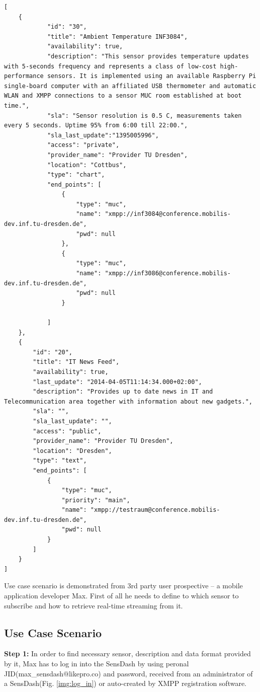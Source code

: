 	\begin{lstlisting}[label=sensor_registry,caption=JSON Description of Sensors]
[
    {
            "id": "30",
            "title": "Ambient Temperature INF3084",
            "availability": true,
            "description": "This sensor provides temperature updates with 5-seconds frequency and represents a class of low-cost high-performance sensors. It is implemented using an available Raspberry Pi single-board computer with an affiliated USB thermometer and automatic WLAN and XMPP connections to a sensor MUC room established at boot time.",
            "sla": "Sensor resolution is 0.5 C, measurements taken every 5 seconds. Uptime 95% from 6:00 till 22:00.",
            "sla_last_update":"1395005996",
            "access": "private",
            "provider_name": "Provider TU Dresden",
            "location": "Cottbus",            
            "type": "chart",
            "end_points": [
                {
                    "type": "muc",
                    "name": "xmpp://inf3084@conference.mobilis-dev.inf.tu-dresden.de",
                    "pwd": null
                },
                {
                    "type": "muc",
                    "name": "xmpp://inf3086@conference.mobilis-dev.inf.tu-dresden.de",
                    "pwd": null
                }

            ]
    },
    {
        "id": "20",
        "title": "IT News Feed",
        "availability": true,
        "last_update": "2014-04-05T11:14:34.000+02:00",
        "description": "Provides up to date news in IT and Telecommunication area together with information about new gadgets.",
        "sla": "",
        "sla_last_update": "",
        "access": "public",
        "provider_name": "Provider TU Dresden",
        "location": "Dresden",
        "type": "text",
        "end_points": [
            {
                "type": "muc",
                "priority": "main",
                "name": "xmpp://testraum@conference.mobilis-dev.inf.tu-dresden.de",
                "pwd": null
            }
        ]        
    }
]
	\end{lstlisting}

Use case scenario is demonstrated from 3rd party user prospective -- a mobile application developer Max. First of all he needs to define to which sensor to subscribe and how to retrieve real-time streaming from it. 

\subsection{Use Case Scenario}
\label{section:use-case-scenario}
\textbf{Step 1:} In order to find necessary sensor, description and data format provided by it, Max has to log in into the SensDash by using peronal JID(max\_sensdash@likepro.co) and password, received from an administrator of a SensDash(Fig. \ref{img:log_in}) or auto-created by XMPP registration software.

